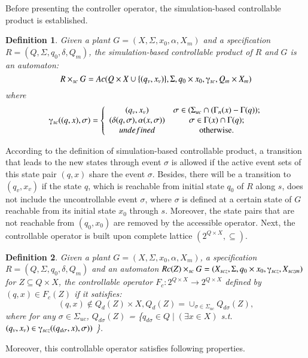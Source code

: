 \documentclass[12pt,draftcls,onecolumn]{IEEEtran}
\newtheorem{Definition}{Definition}
\begin{document}
Before presenting the controller operator, the simulation-based
controllable product is established.
\begin{Definition}
Given a plant $G =(X,\Sigma,x_{0},\alpha,X_{m})$ and a specification
$R =(Q,\Sigma,q_{0},\delta,Q_{m})$, the simulation-based
controllable product of $R$ and $G$ is an automaton:
\[
R \times_{sc} G = Ac ( Q \times X \cup \{(q_{v}, x_{v})\}, \Sigma,
q_0 \times x_0, \gammaup_{sc}, Q_m \times X_m)
\]
where
\[
\ \gammaup_{sc}((q,x),\sigma) = \left\{ {\begin{array}{*{20}c}
   (q_{v}, x_{v}) & {\sigma \in (\Sigma_{uc} \cap (\Gamma_n(x) - \Gamma (q)) };  \\
   (\delta(q, \sigma), \alpha (x, \sigma)) & {\sigma \in \Gamma(x) \cap \Gamma(q)};  \\
   undefined & {\textrm{otherwise}}.  \\
\end{array}} \right.
\]
\end{Definition}
According to the definition of simulation-based controllable
product, a transition that leads to the new states through event
$\sigma$ is allowed if the active event sets of this state pair
$(q, x)$ share the event $\sigma$. Besides, there will be a
transition to $(q_{v}, x_{v})$ if the state $q$,  which is
reachable from initial state $q_0$ of $R$ along $s$, does not
include the uncontrollable event $\sigma$, where $\sigma$ is
defined at a certain state of $G$ reachable from its initial state
$x_0$ through $s$. Moreover, the state pairs that are not
reachable from $(q_0, x_0)$ are removed by the accessible
operator. Next, the controllable operator is built upon complete
lattice $(2^{Q \times X}, \subseteq)$.
\begin{Definition}
Given a plant $G =(X,\Sigma,x_{0},\alpha,X_{m})$, a specification $R
=(Q,\Sigma,q_{0},\delta,Q_{m})$ and an automaton $Rc(Z) \times_{sc}
G =(X_{scz}, \Sigma, q_0 \times x_0, \gammaup_{scz}, X_{sczm})$ for
$Z \subseteq Q \times X$, the controllable operator $F_c: 2^{Q
\times X} \rightarrow 2^{Q \times X}$ defined by $(q, x) \in F_c(Z)$
if it satisfies:
\[
(q, x)\notin Q_d(Z) \times X, Q_d(Z) =
\cup_{\sigma\in\Sigma_{uc}}Q_{d\sigma}(Z),
\]
where for any $\sigma\in\Sigma_{uc}$, $Q_{d\sigma}(Z)$ =
\{$q_{d\sigma} \in Q \mid (\exists x \in X)$ s.t. $(q_v, x_v) \in
\gammaup_{scz}((q_{d\sigma}, x), \sigma))$ \}.
\end{Definition}

Moreover, this controllable operator satisfies following properties.
\end{document}
